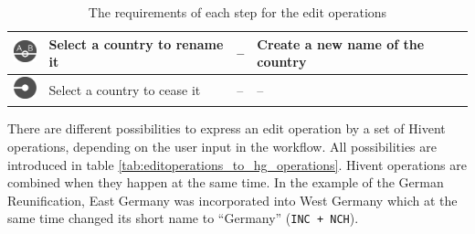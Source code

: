 \begin{table}[H]
\begin{center}
\begin{tabular}{m{0.9cm} m{4.2cm} m{4.2cm} m{3.5cm}}
  \midrule
  \raisebox{-0.35\height}
  {\includegraphics[width=0.72cm]{graphics/development/editing_hivent_data/edit_operations/REN}} &
  Select a country to rename it &
  -- &
  Create a new name of the country \\

  \midrule
  \raisebox{-0.35\height}
  {\includegraphics[width=0.72cm]{graphics/development/editing_hivent_data/edit_operations/CES}} &
  Select a country to cease it &
  -- &
  -- \\

  \bottomrule
\end{tabular}
\caption{The requirements of each step for the edit operations}
\label{tab:editoperations_in_worklow}
\end{center}
\end{table}



\vspace{-1.0em}

There are different possibilities to express an edit operation by a set of Hivent operations, depending on the user input in the workflow. All possibilities are introduced in table \ref{tab:editoperations_to_hg_operations}. Hivent operations are combined when they happen at the same time. In the example of the German Reunification, East Germany was incorporated into West Germany which at the same time changed its short name to ``Germany'' (\texttt{INC + NCH}).

